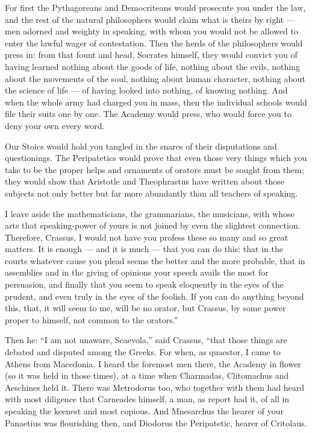  For first the Pythagoreans and Democriteans would prosecute you under the law, and the rest of the natural philosophers would claim what is theirs by right — men adorned and weighty in speaking, with whom you would not be allowed to enter the lawful wager of contestation. Then the herds of the philosophers would press in: from that fount and head, Socrates himself, they would convict you of having learned nothing about the goods of life, nothing about the evils, nothing about the movements of the soul, nothing about human character, nothing about the science of life — of having looked into nothing, of knowing nothing. And when the whole army had charged you in mass, then the individual schools would file their suits one by one. The Academy would press, who would force you to deny your own every word.

 Our Stoics would hold you tangled in the snares of their disputations and questionings. The Peripatetics would prove that even those very things which you take to be the proper helps and ornaments of orators must be sought from them; they would show that Aristotle and Theophrastus have written about those subjects not only better but far more abundantly than all teachers of speaking.

 I leave aside the mathematicians, the grammarians, the musicians, with whose arts that speaking-power of yours is not joined by even the slightest connection. Therefore, Crassus, I would not have you profess these so many and so great matters. It is enough — and it is much — that you can do this: that in the courts whatever cause you plead seems the better and the more probable, that in assemblies and in the giving of opinions your speech avails the most for persuasion, and finally that you seem to speak eloquently in the eyes of the prudent, and even truly in the eyes of the foolish. If you can do anything beyond this, that, it will seem to me, will be no orator, but Crassus, by some power proper to himself, not common to the orators.''

 Then he: ``I am not unaware, Scaevola,'' said Crassus, ``that those things are debated and disputed among the Greeks. For when, as quaestor, I came to Athens from Macedonia, I heard the foremost men there, the Academy in flower (so it was held in those times), at a time when Charmadas, Clitomachus and Aeschines held it. There was Metrodorus too, who together with them had heard with most diligence that Carneades himself, a man, as report had it, of all in speaking the keenest and most copious. And Mnesarchus the hearer of your Panaetius was flourishing then, and Diodorus the Peripatetic, hearer of Critolaus.

